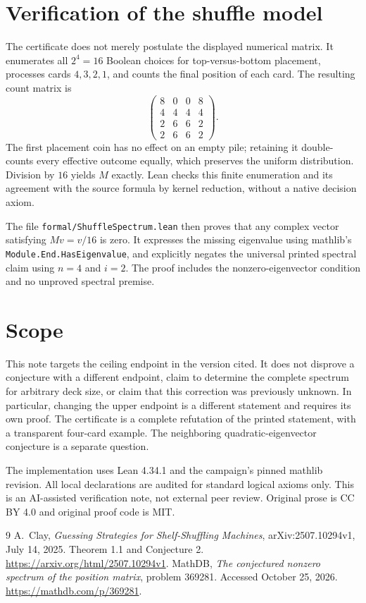 \documentclass[11pt]{article}
\begin{document}
\section{Verification of the shuffle model}
The certificate does not merely postulate the displayed numerical matrix.
It enumerates all $2^4=16$ Boolean choices for top-versus-bottom placement,
processes cards $4,3,2,1$, and counts the final position of each card.
The resulting count matrix is
\[
 \begin{pmatrix}8&0&0&8\\4&4&4&4\\2&6&6&2\\2&6&6&2\end{pmatrix}.
\]
The first placement coin has no effect on an empty pile; retaining it
double-counts every effective outcome equally, which preserves the
uniform distribution. Division by $16$ yields $M$ exactly. Lean checks
this finite enumeration and its agreement with the source formula by
kernel reduction, without a native decision axiom.

The file \texttt{formal/ShuffleSpectrum.lean} then proves that any complex
vector satisfying $Mv=v/16$ is zero. It expresses the missing eigenvalue
using mathlib's \texttt{Module.End.HasEigenvalue}, and explicitly negates
the universal printed spectral claim using $n=4$ and $i=2$.
The proof includes the nonzero-eigenvector condition and no unproved
spectral premise.

\section{Scope}
This note targets the ceiling endpoint in the version cited. It does not
disprove a conjecture with a different endpoint, claim to determine the
complete spectrum for arbitrary deck size, or claim that this correction
was previously unknown. In particular, changing the upper endpoint is a
different statement and requires its own proof. The certificate is a
complete refutation of the printed statement, with a transparent
four-card example. The neighboring quadratic-eigenvector conjecture is a
separate question.

The implementation uses Lean 4.34.1 and the campaign's pinned mathlib
revision. All local declarations are audited for standard logical axioms
only. This is an AI-assisted verification note, not external peer review.
Original prose is CC BY 4.0 and original proof code is MIT.
\begin{thebibliography}{9}
 A.~Clay, \emph{Guessing Strategies for Shelf-Shuffling
Machines}, arXiv:2507.10294v1, July 14, 2025. Theorem 1.1 and Conjecture 2.
\url{https://arxiv.org/html/2507.10294v1}.
 MathDB, \emph{The conjectured nonzero spectrum of the
position matrix}, problem 369281. Accessed October 25, 2026.
\url{https://mathdb.com/p/369281}.
\end{thebibliography}
\end{document}
